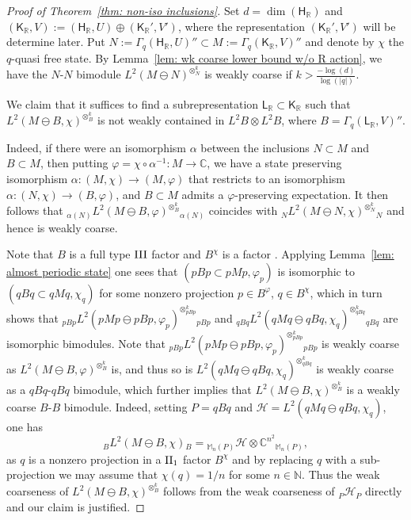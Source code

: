 \documentclass[a4paper,11pt]{amsart}
\theoremstyle{definition}
\newcommand{\C}{{\mathbb C}}
\newcommand{\M}{{\mathbb M}}
\newcommand{\N}{{\mathbb N}}
\newcommand{\R}{{\mathbb R}}
\newcommand{\cH}{{\mathcal H}}
\newcommand{\sH}{\mathsf{H}}
\newcommand{\sK}{\mathsf{K}}
\newcommand{\sL}{\mathsf{L}}
\newcommand{\ot}{\otimes}
\begin{document}
\begin{proof}[Proof of Theorem~\ref{thm: non-iso inclusions}]
Set $d=\dim(\sH_\R)$ and $(\sK_\R, V):=(\sH_\R, U)\oplus(\sK_\R', V')$, where the representation $(\sK_\R', V')$ will be determine later.
Put $N:=\Gamma_q(\sH_\R, U)''\subset M:=\Gamma_q(\sK_\R, V)''$ and denote by $\chi$ the $q$-quasi free state.
By Lemma~\ref{lem: wk coarse lower bound w/o R action}, 
	we have the $N$-$N$ bimodule $L^2(M\ominus N)^{\ot_N^k}$ is weakly coarse if $k>\frac{-\log(d)}{\log(|q|)}$.

We claim that it suffices to find a subrepresentation $\sL_\R\subset \sK_\R$ such that 
	$L^2(M\ominus B,\chi)^{\ot_{B}^k}$ is not weakly contained in $L^2B\ot L^2B$,
	where $B=\Gamma_q(\sL_\R, V)''$.
	
Indeed, if there were an isomorphism $\alpha$ between the inclusions $N\subset M$ and $B\subset M$,
	then putting $\varphi=\chi\circ\alpha^{-1}: M\to \C$,
	we have a state preserving isomorphism $\alpha: (M,\chi)\to (M,\varphi)$ that 
	restricts to an isomorphism $\alpha: (N,\chi)\to (B,\varphi)$,
	and $B\subset M$ admits a $\varphi$-preserving expectation.
It then follows that ${_{\alpha(N)}}{L^2(M\ominus B, \varphi)^{\ot_B^k}}{_{\alpha(N)}}$
	coincides with ${_N}{L^2(M\ominus N,\chi)^{\ot_N^k}}{_N}$
	and hence is weakly coarse.

Note that $B$ is a full	type ${\rm III}$ factor and $B^\chi$ is a factor \cite{KSW23}.
Applying Lemma~\ref{lem: almost periodic state} one sees that $(pBp\subset pMp, \varphi_p)$ is isomorphic to $(qBq\subset qMq,\chi_q)$
	for some nonzero projection $p\in B^\varphi$, $q\in B^\chi$,
	which in turn shows that 
	${_{pBp}}{L^2(pMp\ominus pBp,\varphi_p)^{\ot_{pBp}^k}}{_{pBp}}$
	and ${_{qBq}}{L^2(qMq\ominus qBq,\chi_q)}^{\ot_{qBq}^k}{_{qBq}}$
	are isomorphic bimodules.
Note that  ${_{pBp}}{L^2(pMp\ominus pBp,\varphi_p)^{\ot_{pBp}^k}}{_{pBp}}$ is weakly coarse 
	as ${L^2(M\ominus B, \varphi)^{\ot_B^k}}$ is,
	and thus so is $L^2(qMq\ominus qBq,\chi_q)^{\ot_{qBq}^k}$ is weakly coarse as a $qBq$-$qBq$ bimodule,
	which further implies that $L^2(M\ominus B,\chi)^{\ot_{B}^k}$ is a weakly coarse $B$-$B$ bimodule.
Indeed, setting $P=qBq$ and $\cH=L^2(qMq\ominus qBq,\chi_q)$,
	one has 
	$${_B}{L^2(M\ominus B,\chi)}{_B}={_{\M_n(P)}}{\cH\ot \C^{n^2}}{_{\M_n(P)}},$$
	as $q$ is a nonzero projection in a ${\rm II}_1$ factor $B^\chi$ and by replacing $q$ with a sub-projection we may assume
	that $\chi(q)=1/n$ for some $n\in \N$.
Thus the weak coarseness of $L^2(M\ominus B,\chi)^{\ot_{B}^k}$ follows from the weak coarseness of ${_P}{\cH}{_P}$ directly
	and our claim is justified.
	

\end{proof}
\end{document}
